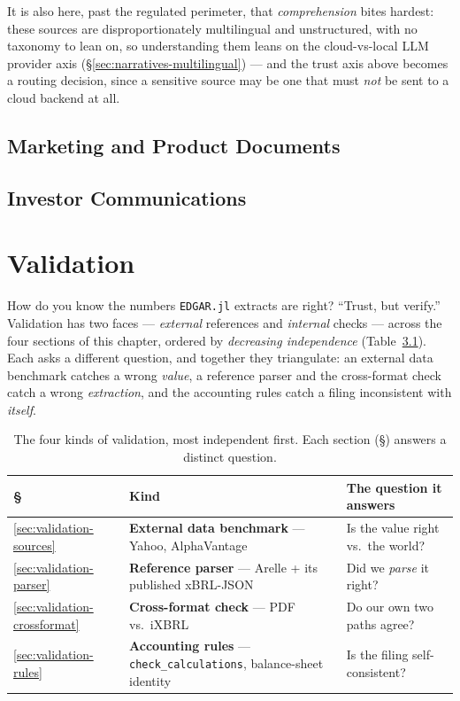 \documentclass[11pt,a4paper]{report}
\begin{document}
\noindent It is also here, past the regulated perimeter, that \emph{comprehension} bites hardest: these
sources are disproportionately multilingual and unstructured, with no taxonomy to lean on, so understanding
them leans on the cloud-vs-local LLM provider axis (\S\ref{sec:narratives-multilingual}) --- and the trust
axis above becomes a routing decision, since a sensitive source may be one that must \emph{not} be sent to a
cloud backend at all.

\section{Marketing and Product Documents}
\label{sec:marketing-sources}

\section{Investor Communications}
\label{sec:investor-comms}

\chapter{Validation}
\label{sec:validation}

How do you know the numbers \texttt{EDGAR.jl} extracts are right? ``Trust, but verify.'' Validation has two
faces --- \emph{external} references and \emph{internal} checks --- across the four sections of this chapter,
ordered by \emph{decreasing independence} (Table~\ref{tab:validation-kinds}). Each asks a different question,
and together they triangulate: an external data benchmark catches a wrong \emph{value}, a reference parser
and the cross-format check catch a wrong \emph{extraction}, and the accounting rules catch a filing
inconsistent with \emph{itself}.

\begin{table}[h]
\centering
\small
\caption{The four kinds of validation, most independent first. Each section (§) answers a distinct question.}
\label{tab:validation-kinds}
\begin{tabular}{@{}p{}p{}p{}@{}}
\toprule
\textbf{\S} & \textbf{Kind} & \textbf{The question it answers} \\
\midrule
\ref{sec:validation-sources}     & \textbf{External data benchmark} --- Yahoo, AlphaVantage & Is the value right vs.\ the world? \\
\ref{sec:validation-parser}      & \textbf{Reference parser} --- Arelle + its published xBRL-JSON & Did we \emph{parse} it right? \\
\ref{sec:validation-crossformat} & \textbf{Cross-format check} --- PDF vs.\ iXBRL & Do our own two paths agree? \\
\ref{sec:validation-rules}       & \textbf{Accounting rules} --- \texttt{check\_calculations}, balance-sheet identity & Is the filing self-consistent? \\
\bottomrule
\end{tabular}
\end{table}
\end{document}
